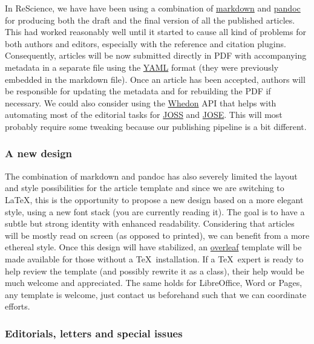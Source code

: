 In ReScience, we have have been using a combination of
\href{https://daringfireball.net/projects/markdown/syntax}{markdown} and
\href{http://pandoc.org/}{pandoc} for producing both the draft and the final
version of all the published articles. This had worked reasonably well until it
started to cause all kind of problems for both authors and editors, especially
with the reference and citation plugins. Consequently, articles will be now
submitted directly in PDF with accompanying metadata in a separate file using
the \href{https://en.wikipedia.org/wiki/YAML}{YAML} format (they were
previously embedded in the markdown file). Once an article has been accepted,
authors will be responsible for updating the metadata and for rebuilding the PDF if
necessary. We could also consider using the
\href{https://github.com/openjournals/whedon}{Whedon} API that helps with automating
most of the editorial tasks for \href{http://joss.theoj.org/}{JOSS} and
\href{http://jose.theoj.org/}{JOSE}. This will most probably require some
tweaking because our publishing pipeline is a bit different.


\subsubsection{A new design}

The combination of markdown and pandoc has also severely limited the layout and
style possibilities for the article template and since we are switching to
\LaTeX, this is the opportunity to propose a new design based on a more elegant
style, using a new font stack\supercite{SourceSerifPro:2014, Roboto:2011,
  SourceCodePro:2012} (you are currently reading it). The goal is to have a
subtle but strong identity with enhanced readability. Considering that articles
will be mostly read on screen (as opposed to printed), we can benefit from a
more ethereal style. Once this design will have stabilized, an
\href{https://www.overleaf.com/}{overleaf} template will be made available for
those without a \TeX~installation. If a \TeX~expert is ready to help review
the template (and possibly rewrite it as a class), their help would be much
welcome and appreciated. The same holds for LibreOffice, Word or Pages, any
template is welcome, just contact us beforehand such that we can coordinate
efforts.


\subsubsection{Editorials, letters and special issues}


